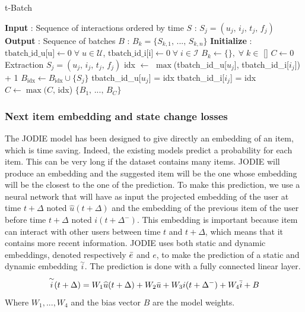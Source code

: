 \begin{algorithm}[htbp]
    \caption{t-Batch}
    \label{t-batch}
    \begin{algorithmic}[1]
        \STATE \textbf{Input} : Sequence of interactions ordered by time $S$ : $S_j = (u_j,\,i_j,\,t_j,\,f_j)$
        \STATE \textbf{Output} : Sequence of batches $B$ : $B_k = \{S_{k,1},\,...,\,S_{k,n} \}$
        \STATE \textbf{Initialize} : 
        \STATE \quad $\text{tbatch\_id\_u[u]} \leftarrow 0 \; \forall \; u \in \mathcal{U}$, \quad $\text{tbatch\_id\_i[i]} \leftarrow 0 \; \forall \; i \in \mathcal{I}$
        \STATE \quad $B_k \leftarrow \{ \},\; \forall \; k \in$ [\!]
        \STATE \quad $C \leftarrow 0$
            \STATE Extraction $S_j = (u_j,\,i_j,\,t_j,\,f_j)$
            \STATE idx $\leftarrow$ $\max$(tbatch\_id\_u[$u_j$], tbatch\_id\_i[$i_j$]) + 1
            \STATE $B_\text{idx} \leftarrow B_\text{idx} \cup \{ S_j \}$
            \STATE tbatch\_id\_u[$u_j$] = idx
            \STATE tbatch\_id\_i[$i_j$] = idx
            \STATE $C \leftarrow \max(C,\,$idx)
        \ENDFOR
        \RETURN $\{ B_1,\,...,\,B_C \}$
    \end{algorithmic}
\end{algorithm}



\subsubsection{Next item embedding and state change losses}

The JODIE model has been designed to give directly an embedding of an item, which is time saving. Indeed, the existing models predict a probability for each item. This can be very long if the dataset contains many items. JODIE will produce an embedding and the suggested item will be the one whose embedding will be the closest to the one of the prediction. To make this prediction, we use a neural network that will have as input the projected embedding of the user at time $t+\Delta$ noted $\widehat u(t+\Delta)$ and the embedding of the previous item of the user before time $t+\Delta$ noted $i(t+\Delta^-)$. This embedding is important because item can interact with other users between time $t$ and $t+\Delta$, which means that it contains more recent information. JODIE uses both static and dynamic embeddings, denoted respectively $\Bar{e}$ and $e$, to make the prediction of a static and dynamic embedding $\overset{\sim}{i}$. The prediction is done with a fully connected linear layer.
$$
\overset{\sim}{i} (t+\Delta) = W_1 \widehat u(t+\Delta) + W_2 \Bar{u} + W_3 i(t+\Delta^-) + W_4 \Bar{i} + B
$$
Where $W_1, ..., W_4$ and the bias vector $B$ are the model weights.\\

